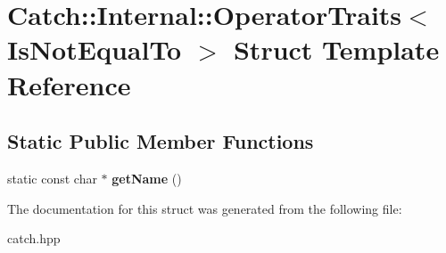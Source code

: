 \hypertarget{structCatch_1_1Internal_1_1OperatorTraits_3_01IsNotEqualTo_01_4}{}\section{Catch\+:\+:Internal\+:\+:Operator\+Traits$<$ Is\+Not\+Equal\+To $>$ Struct Template Reference}
\label{structCatch_1_1Internal_1_1OperatorTraits_3_01IsNotEqualTo_01_4}
\subsection*{Static Public Member Functions}
\begin{DoxyCompactItemize}
\item 
static const char $\ast$ {\bfseries get\+Name} ()\hypertarget{structCatch_1_1Internal_1_1OperatorTraits_3_01IsNotEqualTo_01_4_a54a795b8bf7c80a9fdbc7b81f39133b4}{}\label{structCatch_1_1Internal_1_1OperatorTraits_3_01IsNotEqualTo_01_4_a54a795b8bf7c80a9fdbc7b81f39133b4}

\end{DoxyCompactItemize}


The documentation for this struct was generated from the following file\+:\begin{DoxyCompactItemize}
\item 
catch.\+hpp\end{DoxyCompactItemize}
